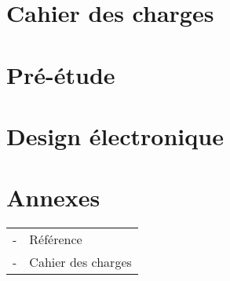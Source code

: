 \documentclass{article}
\begin{document}
 

    
    
    
    \newpage
    \tableofcontents
    \newpage

    \section{Cahier des charges}
        
    \section{Pré-étude}
        
    \section{Design électronique}
        
    \section{Annexes}
        \begin{tabular}{l l}
            - & Référence \\
            - & Cahier des charges \\
        \end{tabular}

    \newpage
    \printbibliography
    \clearpage
\end{document}
